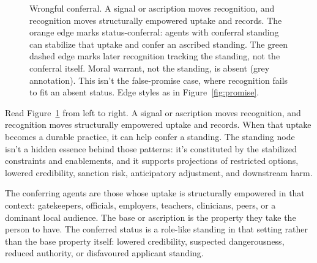 \documentclass[12pt]{article}
\begin{document}
\begin{figure}[H]
  \centering
  \caption{Wrongful conferral. A signal or ascription moves recognition, and recognition moves structurally empowered uptake and records. The orange edge marks status-conferral: agents with conferral standing can stabilize that uptake and confer an ascribed standing. The green dashed edge marks later recognition tracking the standing, not the conferral itself. Moral warrant, not the standing, is absent (grey annotation). This isn't the false-promise case, where recognition fails to fit an absent status. Edge styles as in Figure~\ref{fig:promise}.}
  \label{fig:misrecognition}
\end{figure}

Read Figure~\ref{fig:misrecognition} from left to right. A signal or ascription moves recognition, and recognition moves structurally empowered uptake and records. When that uptake becomes a durable practice, it can help confer a standing. The standing node isn't a hidden essence behind those patterns: it's constituted by the stabilized constraints and enablements, and it supports projections of restricted options, lowered credibility, sanction risk, anticipatory adjustment, and downstream harm.

The conferring agents are those whose uptake is structurally empowered in that context: gatekeepers, officials, employers, teachers, clinicians, peers, or a dominant local audience. The base or ascription is the property they take the person to have. The conferred status is a role-like standing in that setting rather than the base property itself: lowered credibility, suspected dangerousness, reduced authority, or disfavoured applicant standing.
\end{document}
